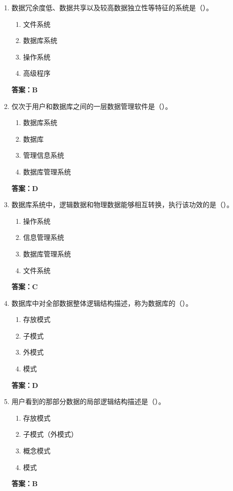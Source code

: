 \documentclass[12pt, a4paper]{article}
\begin{document}
\begin{enumerate}[label=\arabic*.]
	\item 数据冗余度低、数据共享以及较高数据独立性等特征的系统是（\quad）。
	      \begin{enumerate}
		      \item 文件系统
		      \item 数据库系统
		      \item 操作系统
		      \item 高级程序
	      \end{enumerate}
	      \textbf{答案：B}

	\item 仅次于用户和数据库之间的一层数据管理软件是（\quad）。
	      \begin{enumerate}
		      \item 数据库系统
		      \item 数据库
		      \item 管理信息系统
		      \item 数据库管理系统
	      \end{enumerate}
	      \textbf{答案：D}

	\item 数据库系统中，逻辑数据和物理数据能够相互转换，执行该功效的是（\quad）。
	      \begin{enumerate}
		      \item 操作系统
		      \item 信息管理系统
		      \item 数据库管理系统
		      \item 文件系统
	      \end{enumerate}
	      \textbf{答案：C}

	\item 数据库中对全部数据整体逻辑结构描述，称为数据库的（\quad）。
	      \begin{enumerate}
		      \item 存放模式
		      \item 子模式
		      \item 外模式
		      \item 模式
	      \end{enumerate}
	      \textbf{答案：D}

	\item 用户看到的那部分数据的局部逻辑结构描述是（\quad）。
	      \begin{enumerate}
		      \item 存放模式
		      \item 子模式（外模式）
		      \item 概念模式
		      \item 模式
	      \end{enumerate}
	      \textbf{答案：B}


\end{enumerate}
\end{document}

